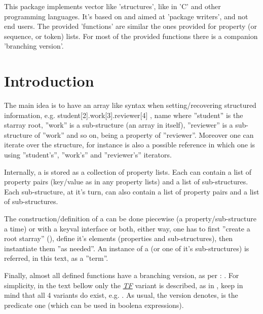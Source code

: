 \documentclass[10pt]{article}
\begin{document}
  
\begin{typesetabstract}

This package implements vector like 'structures', like in 'C' and other programming languages. 
It's based on  and aimed at 'package writers', and not end users. The provided 'functions' are similar the ones provided for property (or sequence, or token) lists. For most of the provided functions there is a companion 'branching version'.

\end{typesetabstract}

\tableofcontents

\section{Introduction}
The main idea is to have an array like syntax when setting/recovering structured information, e.g.  {student[2].work[3].reviewer[4] , name} where ''student'' is the starray root, ''work'' is a sub-structure (an array in itself), ''reviewer'' is a sub-structure of ''work'' and so on,  being a property of ''reviewer''. Moreover one can iterate over the structure, for instance  is also a possible reference in which one is using ''student's'', ''work's'' and ''reviewer's'' iterators.

Internally, a  is stored as a collection of property lists. Each  can contain a list of property pairs (key/value as in any  property lists) and a list of sub-structures. Each sub-structure, at it's turn, can also contain a list of property pairs and a list of sub-structures. 

The construction/definition of a  can be done piecewise (a property/sub-structure a time) or with a keyval interface or both, either way, one has to first ''create a root starray'' (), define it's elements (properties and sub-structures), then instantiate them ''as needed''. An instance of a  (or one of it's sub-structures) is referred, in this text, as a ''term''.

Finally, almost all defined functions have a branching version, as per : . For simplicity, in the text bellow only the \underline{\textsl{TF}} variant is described, as in , keep in mind that all 4 variants do exist, e.g. . As usual, the  version denotes, is the predicate one (which can be used in boolena expressions).
\end{document}
